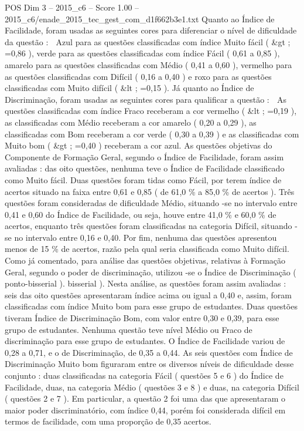\begin{textsample}{POS Dim 3 – 2015\_c6 – Score 1.00 – 2015\_c6/enade\_2015\_tec\_gest\_com\_d1f662b3e1.txt}
Quanto ao Índice de Facilidade, foram usadas as seguintes cores para diferenciar o nível de dificuldade da questão :  Azul para as questões classificadas com índice Muito fácil ( \&gt ; =0,86 ), verde para as questões classificadas com índice Fácil ( 0,61 a 0,85 ), amarelo para as questões classificadas com Médio ( 0,41 a 0,60 ), vermelho para as questões classificadas com Difícil ( 0,16 a 0,40 ) e roxo para as questões classificadas com Muito difícil ( \&lt ; =0,15 ).
Já quanto ao Índice de Discriminação, foram usadas as seguintes cores para qualificar a questão :  As questões classificadas com índice Fraco receberam a cor vermelho ( \&lt ; =0,19 ), as classificadas com Médio receberam a cor amarelo ( 0,20 a 0,29 ), as classificadas com Bom receberam a cor verde ( 0,30 a 0,39 ) e as classificadas com Muito bom ( \&gt ; =0,40 ) receberam a cor azul.
As questões objetivas do Componente de Formação Geral, segundo o Índice de Facilidade, foram assim avaliadas : das oito questões, nenhuma teve o Índice de Facilidade classificado como Muito fácil.
Duas questões foram tidas como Fácil, por terem índice de acertos situado na faixa entre 0,61 e 0,85 ( de 61,0 \% a 85,0 \% de acertos ).
Três questões foram consideradas de dificuldade Médio, situando -se no intervalo entre 0,41 e 0,60 do Índice de Facilidade, ou seja, houve entre 41,0 \% e 60,0 \% de acertos, enquanto três questões foram classificadas na categoria Difícil, situando -se no intervalo entre 0,16 e 0,40.
Por fim, nenhuma das questões apresentou menos de 15 \% de acertos, razão pela qual seria classificada como Muito difícil.
Como já comentado, para análise das questões objetivas, relativas à Formação Geral, segundo o poder de discriminação, utilizou -se o Índice de Discriminação ( ponto-bisserial ). bisserial ).
Nesta análise, as questões foram assim avaliadas : seis das oito questões apresentaram índice acima ou igual a 0,40 e, assim, foram classificadas com índice Muito bom para esse grupo de estudantes.
Duas questões tiveram Índice de Discriminação Bom, com valor entre 0,30 e 0,39, para esse grupo de estudantes.
Nenhuma questão teve nível Médio ou Fraco de discriminação para esse grupo de estudantes.
O Índice de Facilidade variou de 0,28 a 0,71, e o de Discriminação, de 0,35 a 0,44.
As seis questões com Índice de Discriminação Muito bom figuraram entre os diversos níveis de dificuldade desse conjunto : duas classificadas na categoria Fácil ( questões 5 e 6 ) do Índice de Facilidade, duas, na categoria Médio ( questões 3 e 8 ) e duas, na categoria Difícil ( questões 2 e 7 ).
Em particular, a questão 2 foi uma das que apresentaram o maior poder discriminatório, com índice 0,44, porém foi considerada difícil em termos de facilidade, com uma proporção de 0,35 acertos.

\end{textsample}
